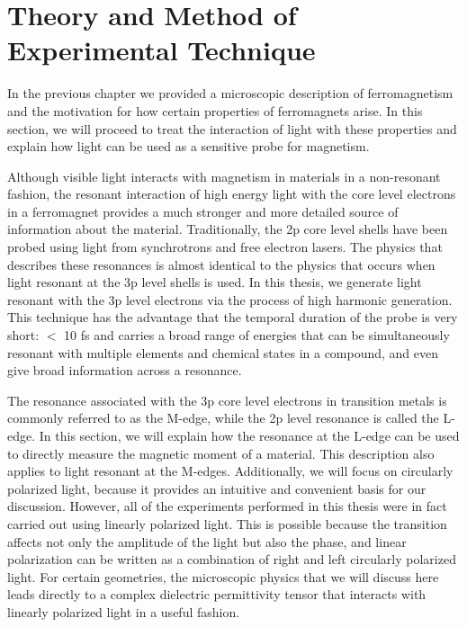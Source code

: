 \chapter{Theory and Method of Experimental Technique}

In the previous chapter we provided a microscopic description of ferromagnetism and the motivation for how certain properties of ferromagnets arise. In this section, we will proceed to treat the interaction of light with these properties and explain how light can be used as a sensitive probe for magnetism. 

Although visible light interacts with magnetism in materials in a non-resonant fashion, the resonant interaction of high energy light with the core level electrons in a ferromagnet provides a much stronger and more detailed source of information about the material. Traditionally, the 2p core level shells have been probed using light from synchrotrons and free electron lasers. The physics that describes these resonances is almost identical to the physics that occurs when light resonant at the 3p level shells is used. In this thesis, we generate light resonant with the 3p level electrons via the process of high harmonic generation. This technique has the advantage that the temporal duration of the probe is very short: $<$ 10 fs and carries a broad range of energies that can be simultaneously resonant with multiple elements and chemical states in a compound, and even give broad information across a resonance. 

The resonance associated with the 3p core level electrons in transition metals is commonly referred to as the M-edge, while the 2p level resonance is called the L-edge. In this section, we will explain how the resonance at the L-edge can be used to directly measure the magnetic moment of a material. This description also applies to light resonant at the M-edges. Additionally, we will focus on circularly polarized light, because it provides an intuitive and convenient basis for our discussion. However, all of the experiments performed in this thesis were in fact carried out using linearly polarized light. This is possible because the transition affects not only the amplitude of the light but also the phase, and linear polarization can be written as a combination of right and left circularly polarized light. For certain geometries, the microscopic physics that we will discuss here leads directly to a complex dielectric permittivity tensor that interacts with linearly polarized light in a useful fashion.

